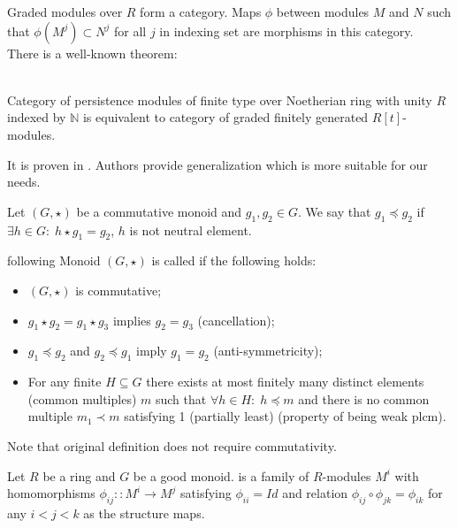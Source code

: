 Graded modules over $R$ form a category. Maps $\phi$ between modules $M$ and $N$ such that $\phi(M^j) \subset N^j$ for all $j$ in indexing set are morphisms in this category.\\

There is a well-known theorem:

\begin{theorem} {\cite[Theorem 3.1]{Zomorodian05}}\\
  Category of persistence modules of finite type over Noetherian ring with unity $R$ indexed by $\mathbb{N}$ is equivalent to category of graded finitely generated $R[t]$-modules.
\end{theorem}

It is proven in {\cite{Corbet18}}. Authors provide generalization which is more suitable for our needs.\\

\begin{definition}
  Let $(G,\star)$ be a commutative monoid and $g_1, g_2 \in G$.
  We say that $g_1 \preceq g_2$ if $\exists h \in G:\; h \star g_1 = g_2$, $h$ is not neutral element.
\end{definition}

\begin{definition} {following \cite[Definition 11]{Corbet18}}
  Monoid $(G,\star)$ is called  if the following holds:
  \begin{itemize}
    \item $(G, \star)$ is commutative;
    \item $g_1 \star g_2 = g_1 \star g_3$ implies $g_2 = g_3$ (cancellation);
    \item $g_1 \preceq g_2$ and $g_2 \preceq g_1$ imply $g_1 = g_2$ (anti-symmetricity);
    \item For any finite $H \subseteq G$ there exists at most finitely many distinct elements (common multiples) $m$ such that $\forall h \in H:\; h \preceq m$ and there is no common multiple $m_1 \prec m$ satisfying 1 (partially least) (property of being weak plcm).
  \end{itemize}
\end{definition}

Note that original definition does not require commutativity.

\begin{definition} {\cite[Definition 12]{Corbet18}}
  Let $R$ be a ring and $G$ be a good monoid.  is a family of $R$-modules $M^i$ with homomorphisms $\phi_{ij} :: M^i \to M^{j}$ satisfying $\phi_{ii} = Id$ and relation $\phi_{ij} \circ \phi_{jk} = \phi_{ik}$ for any $i < j < k$ as the structure maps.
\end{definition}

